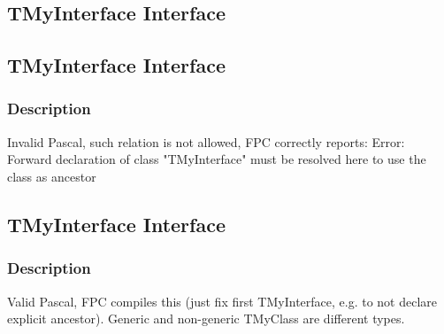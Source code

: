 \documentclass{report}
\newif\ifpdf
\begin{document}
\subsection*{\large{\textbf{TMyInterface Interface}}\normalsize\hspace{1ex}\hrulefill}
\else
\subsection*{TMyInterface Interface}
\fi
\label{ok_recursive_ancestor.TMyInterface}
\subsubsection*{\large{\textbf{Description}}\normalsize\hspace{1ex}\hfill}
Invalid Pascal, such relation is not allowed, FPC correctly reports: Error: Forward declaration of class "TMyInterface" must be resolved here to use the class as ancestor\ifpdf
\subsection*{\large{\textbf{TMyInterface Interface}}\normalsize\hspace{1ex}\hrulefill}
\else
\subsection*{TMyInterface Interface}
\fi
\label{ok_recursive_ancestor.TMyInterface}
\subsubsection*{\large{\textbf{Description}}\normalsize\hspace{1ex}\hfill}
Valid Pascal, FPC compiles this (just fix first TMyInterface, e.g. to not declare explicit ancestor). Generic and non{-}generic TMyClass are different types.
\end{document}
